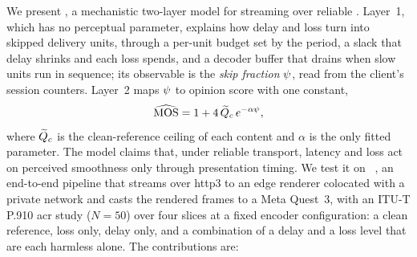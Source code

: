 We present \crystal, a mechanistic two-layer \qoe model for \vpcc
streaming over reliable \quic. Layer~1, which has no perceptual
parameter, explains how delay and loss turn into skipped delivery
units, through a per-unit budget set by the \gof period, a slack that
delay shrinks and each loss spends, and a decoder buffer that drains
when slow units run in sequence; its observable is the \emph{skip
fraction} $\psi$, read from the client's session counters. Layer~2
maps $\psi$ to opinion score with one constant,
\begin{equation}
  \widehat{\mathrm{MOS}} = 1 + 4\,\widetilde{Q}_c\, e^{-\alpha \psi},
  \label{eq:crystal-intro}
\end{equation}
where $\widetilde{Q}_c$ is the clean-reference ceiling of each content and $\alpha$
is the only fitted parameter. The model claims that, under reliable
transport, latency and loss act on perceived smoothness only through
presentation timing. We test it on \mosaic~\cite{mosaic2026}, an
end-to-end pipeline that streams \vpcc over \gls{http3} to an edge
renderer colocated with a private \fiveg network and casts the
rendered frames to a Meta Quest~3, with an ITU-T P.910 \gls{acr} study
($N=50$) over four slices at a fixed encoder configuration: a clean
reference, loss only, delay only, and a combination of a delay and a
loss level that are each harmless alone. The contributions are:

